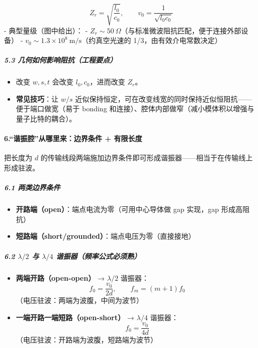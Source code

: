 \documentclass[12pt,a4paper,oneside]{ctexbook}
\providecommand{\tightlist}{%
  \setlength{\itemsep}{0pt}\setlength{\parskip}{0pt}}
\let\oldparagraph\paragraph
\renewcommand{\paragraph}[1]{\oldparagraph{#1}\mbox{}}
\let\oldsubparagraph\subparagraph
\renewcommand{\subparagraph}[1]{\oldsubparagraph{#1}\mbox{}}
\begin{document}
\[Z_r=\sqrt{\frac{l_0}{c_0}},\qquad v_0=\frac{1}{\sqrt{l_0c_0}}\] -
典型量级（图中给出）： -
\(Z_r\sim 50~\Omega\)（与标准微波阻抗匹配，便于连接外部设备） -
\(v_0\sim 1.3\times10^8~\text{m/s}\)（约真空光速的
1/3，由有效介电常数决定）

\subparagraph{5.3
几何如何影响阻抗（工程要点）}\label{ux51e0ux4f55ux5982ux4f55ux5f71ux54cdux963bux6297ux5de5ux7a0bux8981ux70b9}

\begin{itemize}
\tightlist
\item
  改变 \(w,s,t\) 会改变 \(l_0,c_0\)，进而改变 \(Z_r\)。
\item
  \textbf{常见技巧}：让 \(w/s\)
  近似保持恒定，可在改变线宽的同时保持近似恒阻抗------便于端口做宽（易于
  bonding 和连接）、腔体内部做窄（减小模体积以增强与量子比特的耦合）。
\end{itemize}


\paragraph{ 6.``谐振腔''从哪里来：边界条件 +
有限长度}\label{ux8c10ux632fux8154ux4eceux54eaux91ccux6765ux8fb9ux754cux6761ux4ef6-ux6709ux9650ux957fux5ea6}

把长度为 \(d\)
的传输线段两端施加边界条件即可形成谐振器------相当于在传输线上形成驻波。

\subparagraph{6.1
两类边界条件}\label{ux4e24ux7c7bux8fb9ux754cux6761ux4ef6}

\begin{itemize}
\tightlist
\item
  \textbf{开路端（open）}：端点电流为零（可用中心导体做 gap 实现，gap
  形成高阻抗）
\item
  \textbf{短路端（short/grounded）}：端点电压为零（直接接地）
\end{itemize}

\subparagraph{\texorpdfstring{6.2 \(\lambda/2\) 与 \(\lambda/4\)
谐振器（频率公式必须熟）}{6.2 \textbackslash{}lambda/2 与 \textbackslash{}lambda/4 谐振器（频率公式必须熟）}}\label{lambda2-ux4e0e-lambda4-ux8c10ux632fux5668ux9891ux7387ux516cux5f0fux5fc5ux987bux719f}

\begin{itemize}
\item
  \textbf{两端开路（open-open）} → \(\lambda/2\) 谐振器：
  \[f_0=\frac{v_0}{2d},\qquad f_m=(m+1)f_0\]
  （电压驻波：两端为波腹，中间为波节）
\item
  \textbf{一端开路一端短路（open-short）} → \(\lambda/4\) 谐振器：
  \[f_0=\frac{v_0}{4d}\] （电压驻波：开路端为波腹，短路端为波节）
\end{itemize}
\end{document}
